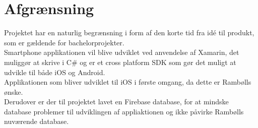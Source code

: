 \chapter{Afgrænsning}
Projektet har en naturlig begrænsning i form af den korte tid fra idé til produkt, som er gældende for bachelorprojekter.\\
Smartphone applikationen vil blive udviklet ved anvendelse af Xamarin, det muliggør at skrive i C\# og er et cross platform SDK som gør det muligt at udvikle til både iOS og Android. \\
Applikationen som bliver udviklet til iOS i første omgang, da dette er Rambølls ønske. \\
Derudover er der til projektet lavet en Firebase database, for at mindske database problemer til udviklingen af appliaktionen og ikke påvirke Rambølls nuværende database.


